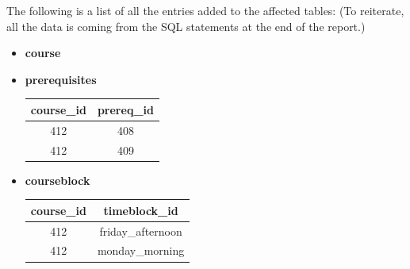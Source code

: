 \documentclass{report}
\makeatletter
\newenvironment{fullcenter}%
    {\@parboxrestore%
    \begin{adjustwidth}{}{\leftmargin}%
    \begin{center}%
    }{\end{center}%
    \end{adjustwidth}%
    }
\makeatother
\begin{document}
The following is a list of all the entries added to the affected tables: (To reiterate, all the data is coming from the SQL statements at the end of the report.)
\begin{itemize}

    \item \textbf{course}
    \begin{fullcenter}
    \end{fullcenter}

\pagebreak

    \item \textbf{prerequisites}
    \bigskip
    \begin{fullcenter}
        \begin{tabular}{| c | c |}
            \hline
            \textbf{course\_id} & \textbf{prereq\_id} \\
            \hline
            412 & 408 \\
            412 & 409 \\
            \hline
        \end{tabular}
    \end{fullcenter}

    \item \textbf{courseblock}
    \bigskip
    \begin{fullcenter}
        \begin{tabular}{| c | c |}
            \hline
            \textbf{course\_id} & \textbf{timeblock\_id} \\
            \hline
            412 & friday\_afternoon \\
            412 & monday\_morning \\
            \hline
        \end{tabular}
    \end{fullcenter}


\end{itemize}
\end{document}
